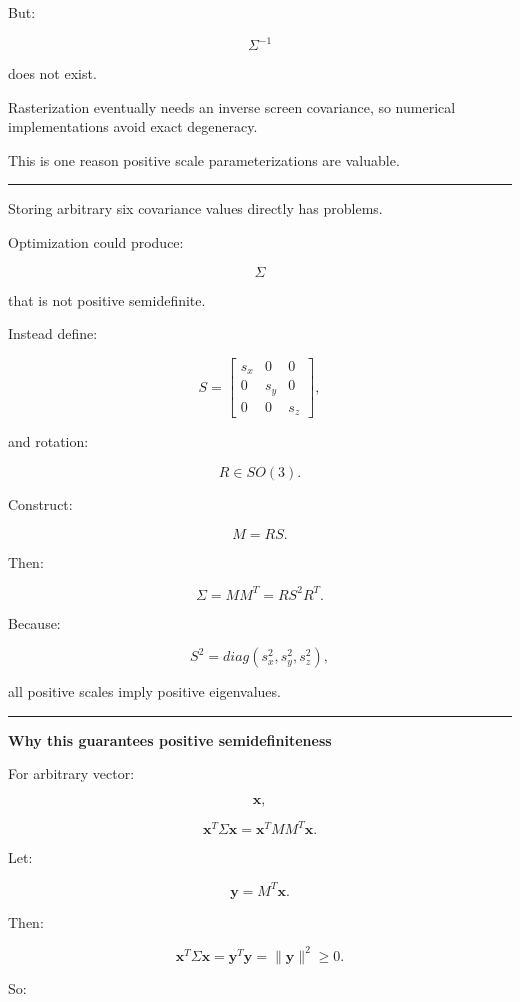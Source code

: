 But:

\[
\Sigma^{-1}
\]

does not exist.

Rasterization eventually needs an inverse screen covariance, so numerical implementations avoid exact degeneracy.

This is one reason positive scale parameterizations are valuable.

\begin{center}\rule{0.5\linewidth}{0.5pt}\end{center}

Storing arbitrary six covariance values directly has problems.

Optimization could produce:

\[
\Sigma
\]

that is not positive semidefinite.

Instead define:

\[
S=
\begin{bmatrix}
s_x&0&0\\
0&s_y&0\\
0&0&s_z
\end{bmatrix},
\]

and rotation:

\[
R\in SO(3).
\]

Construct:

\[
M=RS.
\]

Then:

\[
\boxed{
\Sigma
=
MM^T
=
RS^2R^T.
}
\]

Because:

\[
S^2=
diag(
s_x^2,
s_y^2,
s_z^2
),
\]

all positive scales imply positive eigenvalues.

\begin{center}\rule{0.5\linewidth}{0.5pt}\end{center}

\textbf{Why this guarantees positive semidefiniteness}

For arbitrary vector:

\[
\mathbf x,
\]

\[
\mathbf x^T
\Sigma
\mathbf x
=
\mathbf x^T
MM^T
\mathbf x.
\]

Let:

\[
\mathbf y=M^T\mathbf x.
\]

Then:

\[
\mathbf x^T
\Sigma
\mathbf x
=
\mathbf y^T\mathbf y
=
\|\mathbf y\|^2
\ge0.
\]

So:

